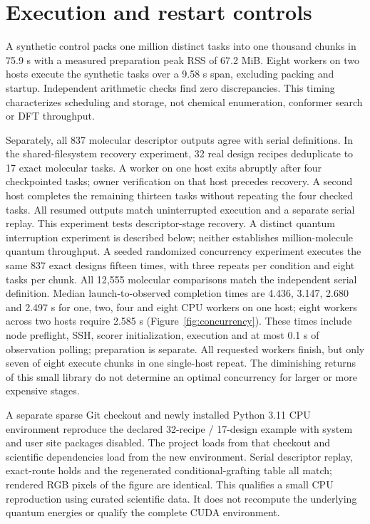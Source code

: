 \documentclass[11pt]{article}
\begin{document}
\section{Execution and restart controls}
A synthetic control packs one million distinct tasks into one thousand chunks in 75.9 s with a measured preparation peak RSS of 67.2 MiB. Eight workers on two hosts execute the synthetic tasks over a 9.58 s span, excluding packing and startup. Independent arithmetic checks find zero discrepancies. This timing characterizes scheduling and storage, not chemical enumeration, conformer search or DFT throughput.

Separately, all 837 molecular descriptor outputs agree with serial definitions. In the shared-filesystem recovery experiment, 32 real design recipes deduplicate to 17 exact molecular tasks. A worker on one host exits abruptly after four checkpointed tasks; owner verification on that host precedes recovery. A second host completes the remaining thirteen tasks without repeating the four checked tasks. All resumed outputs match uninterrupted execution and a separate serial replay. This experiment tests descriptor-stage recovery. A distinct quantum interruption experiment is described below; neither establishes million-molecule quantum throughput.
A seeded randomized concurrency experiment executes the same 837 exact designs fifteen times, with three repeats per condition and eight tasks per chunk. All 12,555 molecular comparisons match the independent serial definition. Median launch-to-observed completion times are 4.436, 3.147, 2.680 and 2.497 s for one, two, four and eight CPU workers on one host; eight workers across two hosts require 2.585 s (Figure~\ref{fig:concurrency}). These times include node preflight, SSH, scorer initialization, execution and at most 0.1 s of observation polling; preparation is separate. All requested workers finish, but only seven of eight execute chunks in one single-host repeat. The diminishing returns of this small library do not determine an optimal concurrency for larger or more expensive stages.

A separate sparse Git checkout and newly installed Python 3.11 CPU environment reproduce the declared 32-recipe / 17-design example with system and user site packages disabled. The project loads from that checkout and scientific dependencies load from the new environment. Serial descriptor replay, exact-route holds and the regenerated conditional-grafting table all match; rendered RGB pixels of the figure are identical. This qualifies a small CPU reproduction using curated scientific data. It does not recompute the underlying quantum energies or qualify the complete CUDA environment.
\end{document}
